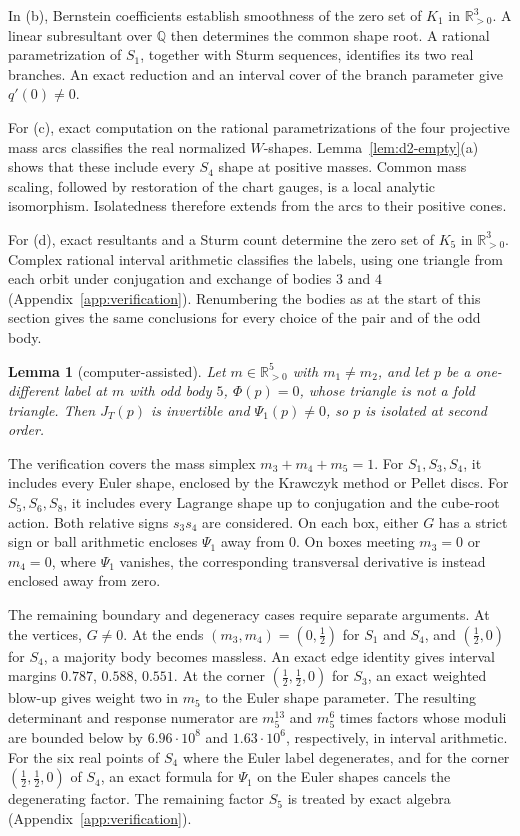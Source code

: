 \documentclass[11pt]{amsart}
\newtheorem{lemma}[theorem]{Lemma}
\theoremstyle{definition}
\theoremstyle{remark}
\newcommand{\Rp}{\mathbb{R}_{>0}}
\begin{document}
{In (b), Bernstein coefficients establish smoothness of the zero set
of $K_1$ in $\Rp^3$.  A linear subresultant over $\mathbb Q$ then determines the common
shape root.  A rational parametrization of $S_1$, together with Sturm sequences,
identifies its two real branches.  An exact reduction and an interval cover of the
branch parameter give $q'(0)\ne0$.

For (c), exact computation on the rational parametrizations of the four projective mass
arcs classifies the real normalized $W$-shapes.  Lemma~\ref{lem:d2-empty}(a) shows that
these include every $S_4$ shape at positive masses.
Common mass scaling, followed by restoration of the chart gauges, is a local analytic
isomorphism.  Isolatedness therefore extends from the arcs to their positive cones.

For (d), exact resultants and a Sturm count determine the zero set of $K_5$ in $\Rp^3$.
Complex rational interval arithmetic classifies the labels, using one triangle from
each orbit under conjugation and exchange of bodies $3$ and $4$
(Appendix~\ref{app:verification}).
Renumbering the bodies as at the start of this section gives the same conclusions for
every choice of the pair and of the odd body.}

\begin{lemma}[computer-assisted]\label{lem:d2-P}
Let $m\in\Rp^5$ with $m_1\ne m_2$, and let $p$ be a one-different label at $m$ with odd body $5$,
$\Phi(p)=0$, whose triangle is not a fold triangle.  Then $J_T(p)$ is invertible and
$\Psi_1(p)\ne0$, so $p$ is isolated at second order.
\end{lemma}

{The verification covers the mass simplex $m_3+m_4+m_5=1$.
For $S_1,S_3,S_4$, it includes every Euler shape, enclosed by the Krawczyk method or
Pellet discs.  For $S_5,S_6,S_8$, it includes every Lagrange shape up to conjugation and
the cube-root action.  Both relative signs $s_3s_4$ are considered.
On each box, either $G$ has a strict sign or ball arithmetic encloses $\Psi_1$ away from
$0$.  On boxes meeting $m_3=0$ or $m_4=0$, where $\Psi_1$ vanishes, the corresponding
transversal derivative is instead enclosed away from zero.}

{The remaining boundary and degeneracy cases require separate arguments.
At the vertices, $G\ne0$.
At the ends $(m_3,m_4)=(0,\frac12)$ for $S_1$ and $S_4$, and $(\frac12,0)$ for $S_4$, a
majority body becomes massless.  An exact edge identity gives interval margins
$0.787$, $0.588$, $0.551$.
At the corner $(\frac12,\frac12,0)$ for $S_3$, an exact weighted blow-up gives weight
two in $m_5$ to the Euler shape parameter.  The resulting determinant and response
numerator are $m_5^{13}$ and $m_5^6$ times factors whose moduli are bounded below by
$6.96\cdot10^8$ and $1.63\cdot10^6$, respectively, in interval arithmetic.
For the six real points of $S_4$ where the Euler label degenerates, and for the corner
$(\frac12,\frac12,0)$ of $S_4$, an exact formula for $\Psi_1$ on the Euler shapes cancels
the degenerating factor.
The remaining factor $S_5$ is treated by exact algebra (Appendix~\ref{app:verification}).}
\end{document}
